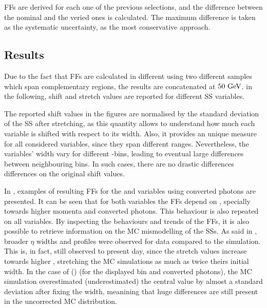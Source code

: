 \acp{FF} are derived for each one of the previous selections, and the difference between the nominal and the veried ones is calculated. The maximum difference is taken as the systematic uncertainty, as the most conservative approach.










\subsection{Results}
\label{subsec:ss_corrections:ffs:results}


Due to the fact that \acp{FF} are calculated in different \pt using two different samples which span complementary regions, the results are concatenated at \(50~\text{GeV}\). in the following, shift and stretch values are reported for different \ac{SS} variables.

The reported shift values in the figures are normalised by the standard deviation of the \ac{SS} after stretching, as this quantity allows to understand how much each variable is shifted with respect to its width. Also, it provides an unique measure for all considered variables, since they span different ranges. Nevertheless, the variables' width vary for different \pt-\abseta bins, leading to eventual large differences between neighbouring bins. In such cases, there are no drastic differences differences on the original shift values.

In \Fig{\ref{fig:ss_corrections:ffs:reslts:ffs}}, examples of resulting \acp{FF} for the \reta and \weta variables using converted photons are presented. It can be seen that for both variables the \acp{FF} depend on \pt, specially towards higher momenta and converted photons. This behaviour is also repeated on all variables.
By inspecting the behaviours and trends of the \acp{FF}, it is also possible to retrieve information on the \ac{MC} mismodelling of the \acp{SS}. As said in \Sect{\ref{sec:pid_ss:ss_differences}}, broader \(\eta\) widths and profiles were observed for data compared to the simulation. This is, in fact, still observed to present day, since the stretch values increase towards higher \pt, stretching the \ac{MC} simulations as much as twice theirs initial width. In the case of \reta (\weta) (for the displayed \abseta bin and converted photons), the \ac{MC} simulation overestimated (underestimated) the central value by almost a standard deviation after fixing the width, meanining that huge differences are still present in the uncorrected \ac{MC} distribution. 


